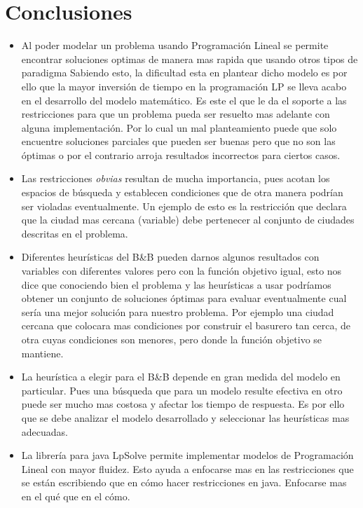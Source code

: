 \documentclass[10pt]{article}
\begin{document}
\section{Conclusiones}
\begin{itemize}
 \item Al poder modelar un problema usando Programación Lineal se permite encontrar soluciones optimas de manera mas rapida que usando otros tipos de paradigma
Sabiendo esto, la dificultad esta en plantear dicho modelo es por ello que la mayor inversión de tiempo en la programación LP se lleva acabo en el desarrollo del modelo matemático. Es este el que le da el soporte a las restricciones para que un problema
pueda ser resuelto mas adelante con alguna implementación. Por lo cual un mal planteamiento puede que solo encuentre soluciones parciales que pueden ser buenas pero que no son las 
óptimas o por el contrario arroja resultados incorrectos para ciertos casos.
\item Las restricciones \emph{obvias} resultan de mucha importancia, pues acotan los espacios de búsqueda y establecen condiciones que de otra manera podrían ser violadas eventualmente. 
Un ejemplo de esto es la restricción que declara que la ciudad mas cercana (variable) debe pertenecer al conjunto de ciudades descritas en el problema.
\item Diferentes heurísticas del B\&B pueden darnos algunos resultados con variables con diferentes valores pero con la función objetivo igual, esto nos dice que conociendo bien el problema
y las heurísticas a usar podríamos obtener un conjunto de soluciones óptimas para evaluar eventualmente cual sería una mejor solución para nuestro problema. Por ejemplo una ciudad cercana
que colocara mas condiciones por construir el basurero tan cerca, de otra cuyas condiciones son menores, pero donde la función objetivo se mantiene.
\item La heurística a elegir para el B\&B depende en gran medida del modelo en particular. Pues una búsqueda que para un modelo resulte efectiva en otro puede ser mucho mas costosa y 
afectar los tiempo de respuesta. Es por ello que se debe analizar el modelo desarrollado y seleccionar las heurísticas mas adecuadas.
\item La librería para java LpSolve permite implementar modelos de Programación Lineal con mayor fluidez. Esto ayuda a enfocarse mas en las restricciones que se están escribiendo que en cómo 
hacer restricciones en java. Enfocarse mas en el qué que en el cómo.
\end{itemize}
\end{document}
